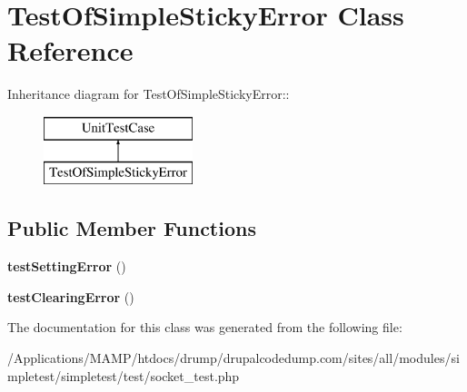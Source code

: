 \hypertarget{class_test_of_simple_sticky_error}{
\section{TestOfSimpleStickyError Class Reference}
\label{class_test_of_simple_sticky_error}
}
Inheritance diagram for TestOfSimpleStickyError::\begin{figure}[H]
\begin{center}
\leavevmode
\includegraphics[height=2cm]{class_test_of_simple_sticky_error}
\end{center}
\end{figure}
\subsection*{Public Member Functions}
\begin{DoxyCompactItemize}
\item 
\hypertarget{class_test_of_simple_sticky_error_a7831981bfda9fc2ad9024977581ebb7c}{
{\bfseries testSettingError} ()}
\label{class_test_of_simple_sticky_error_a7831981bfda9fc2ad9024977581ebb7c}

\item 
\hypertarget{class_test_of_simple_sticky_error_a711e7dd401ee84c2d5765dbe714fe88a}{
{\bfseries testClearingError} ()}
\label{class_test_of_simple_sticky_error_a711e7dd401ee84c2d5765dbe714fe88a}

\end{DoxyCompactItemize}


The documentation for this class was generated from the following file:\begin{DoxyCompactItemize}
\item 
/Applications/MAMP/htdocs/drump/drupalcodedump.com/sites/all/modules/simpletest/simpletest/test/socket\_\-test.php\end{DoxyCompactItemize}
